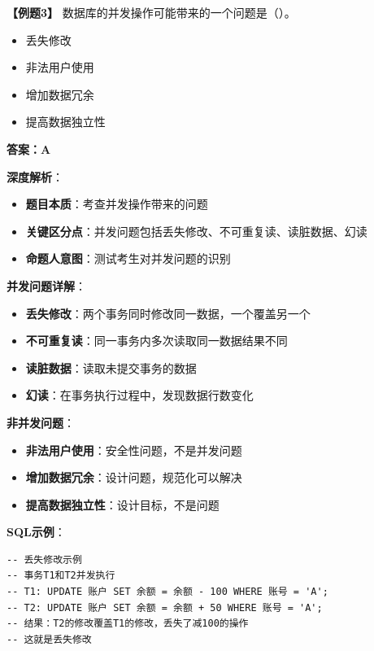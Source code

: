 \documentclass[12pt, a4paper]{article}
\newenvironment{bluebox}[1]{%
  \begin{trivlist}
  \item[\hskip\labelsep \textbf{#1}]
  \setlength{\parskip}{0.5ex}
  \setlength{\itemsep}{0.5ex}
}{%
  \end{trivlist}
  }
\begin{document}
\begin{bluebox}{例题3：并发问题}
	\textbf{【例题3】} 数据库的并发操作可能带来的一个问题是（\quad）。

	\begin{itemize}
		\item[A)] 丢失修改
		\item[B)] 非法用户使用
		\item[C)] 增加数据冗余
		\item[D)] 提高数据独立性
	\end{itemize}

	\textbf{答案：A}

	\textbf{深度解析}：

	\begin{itemize}[leftmargin=*, nosep]
		\item \textbf{题目本质}：考查并发操作带来的问题
		\item \textbf{关键区分点}：并发问题包括丢失修改、不可重复读、读脏数据、幻读
		\item \textbf{命题人意图}：测试考生对并发问题的识别
	\end{itemize}

	\textbf{并发问题详解}：

	\begin{itemize}[leftmargin=*, nosep]
		\item \textbf{丢失修改}：两个事务同时修改同一数据，一个覆盖另一个
		\item \textbf{不可重复读}：同一事务内多次读取同一数据结果不同
		\item \textbf{读脏数据}：读取未提交事务的数据
		\item \textbf{幻读}：在事务执行过程中，发现数据行数变化
	\end{itemize}

	\textbf{非并发问题}：

	\begin{itemize}[leftmargin=*, nosep]
		\item \textbf{非法用户使用}：安全性问题，不是并发问题
		\item \textbf{增加数据冗余}：设计问题，规范化可以解决
		\item \textbf{提高数据独立性}：设计目标，不是问题
	\end{itemize}

	\textbf{SQL示例}：
	\begin{verbatim}
-- 丢失修改示例
-- 事务T1和T2并发执行
-- T1: UPDATE 账户 SET 余额 = 余额 - 100 WHERE 账号 = 'A';
-- T2: UPDATE 账户 SET 余额 = 余额 + 50 WHERE 账号 = 'A';
-- 结果：T2的修改覆盖T1的修改，丢失了减100的操作
-- 这就是丢失修改
	\end{verbatim}


\end{bluebox}
\end{document}
